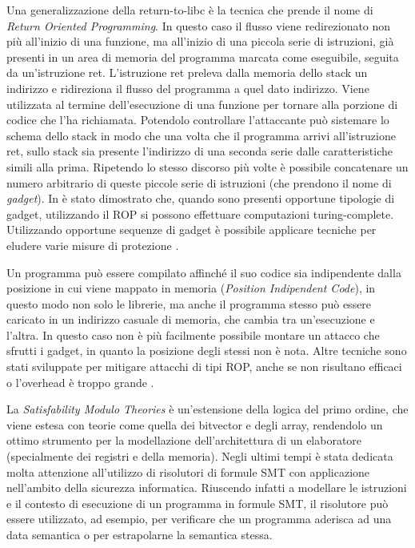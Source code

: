 Una generalizzazione della return-to-libc è la tecnica che prende il
nome di \emph{Return Oriented
  Programming}\cite{Shacham-2007,Roemer-2012}. In questo caso il
flusso viene redirezionato non più all'inizio di una funzione, ma
all'inizio di una piccola serie di istruzioni, già presenti in un area
di memoria del programma marcata come eseguibile, seguita da
un'istruzione ret. L'istruzione ret preleva dalla memoria dello stack
un indirizzo e ridireziona il flusso del programma a quel dato
indirizzo. Viene utilizzata al termine dell'esecuzione di una funzione
per tornare alla porzione di codice che l'ha richiamata. Potendolo
controllare l'attaccante può sistemare lo schema dello stack in modo
che una volta che il programma arrivi all'istruzione ret, sullo stack
sia presente l'indirizzo di una seconda serie dalle caratteristiche
simili alla prima. Ripetendo lo stesso discorso più volte è possibile
concatenare un numero arbitrario di queste piccole serie di istruzioni
(che prendono il nome di \emph{gadget}). In \cite{roemer-12} è stato
dimostrato che, quando sono presenti opportune tipologie di gadget,
utilizzando il ROP si possono effettuare computazioni
turing-complete. Utilizzando opportune sequenze di gadget è possibile
applicare tecniche per eludere varie misure di protezione
\cite{roglia:2009}.

Un programma può essere compilato affinché il suo codice sia
indipendente dalla posizione in cui viene mappato in memoria
(\emph{Position Indipendent Code}), in questo modo non solo le
librerie, ma anche il programma stesso può essere caricato in un
indirizzo casuale di memoria, che cambia tra un'esecuzione e
l'altra. In questo caso non è più facilmente possibile montare un
attacco che sfrutti i gadget, in quanto la posizione degli stessi non
è nota. Altre tecniche sono stati sviluppate per mitigare attacchi di
tipi ROP, anche se non risultano efficaci o l'overhead è troppo grande
\cite{Davi-2014}.

La \emph{Satisfability Modulo Theories}\cite{Barrett-14} è
un'estensione della logica del primo ordine, che viene estesa con
teorie come quella dei bitvector e degli array, rendendolo un ottimo
strumento per la modellazione dell'architettura di un elaboratore
(specialmente dei registri e della memoria). Negli ultimi tempi è
stata dedicata molta attenzione all'utilizzo di risolutori di formule
SMT con applicazione nell'ambito della sicurezza\cite{}
informatica. Riuscendo infatti a modellare le istruzioni e il contesto
di esecuzione di un programma in formule SMT, il risolutore può essere
utilizzato, ad esempio, per verificare che un programma aderisca ad
una data semantica o per estrapolarne la semantica stessa.

